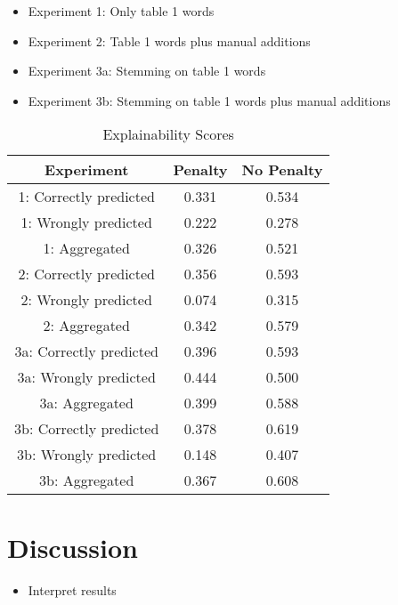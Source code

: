 \documentclass{article}
\begin{document}
\begin{itemize}
\tightlist
\item
  Experiment 1: Only table 1 words
\item
  Experiment 2: Table 1 words plus manual additions
\item
  Experiment 3a: Stemming on table 1 words
\item
  Experiment 3b: Stemming on table 1 words plus manual additions
\end{itemize}

\begin{table}
 \caption{Explainability Scores}
  \centering
  \begin{tabular}{|c|c|c|}
    \hline
    \rowcolor{lightgray} \textbf{Experiment} & \textbf{Penalty} & \textbf{No Penalty} \\
    \hline
    1: Correctly predicted & 0.331 & 0.534 \\
    \hline
    1: Wrongly predicted & 0.222 & 0.278 \\
    \hline
    1: Aggregated & 0.326 & 0.521 \\
    \hline
    2: Correctly predicted & 0.356 & 0.593 \\
    \hline
    2: Wrongly predicted & 0.074 & 0.315 \\
    \hline
    2: Aggregated & 0.342 & 0.579 \\
    \hline
    3a: Correctly predicted & \cellcolor{green} 0.396 & 0.593 \\
    \hline
    3a: Wrongly predicted & \cellcolor{green} 0.444 & \cellcolor{green} 0.500 \\
    \hline
    3a: Aggregated & \cellcolor{green} 0.399 & 0.588 \\
    \hline
    3b: Correctly predicted & 0.378 & \cellcolor{green} 0.619 \\
    \hline
    3b: Wrongly predicted & 0.148 & 0.407 \\
    \hline
    3b: Aggregated & 0.367 & \cellcolor{green} 0.608 \\
    \hline
  \end{tabular}
  \label{tab:expl}
\end{table}

\hypertarget{discussion}{%
\section{Discussion}\label{discussion}}

\label{sec:discuss}

\begin{itemize}
\tightlist
\item
  Interpret results
\end{itemize}
\end{document}
